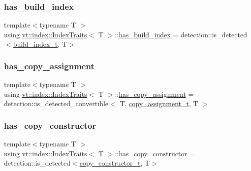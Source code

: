\subsubsection{\texorpdfstring{has\+\_\+build\+\_\+index}{has\_build\_index}}
{\footnotesize\ttfamily template$<$typename T $>$ \\
using \hyperlink{structvt_1_1index_1_1_index_traits}{vt\+::index\+::\+Index\+Traits}$<$ T $>$\+::\hyperlink{structvt_1_1index_1_1_index_traits_a9507b2186fbda410df0f7c685504e314}{has\+\_\+build\+\_\+index} =  detection\+::is\+\_\+detected$<$\hyperlink{structvt_1_1index_1_1_index_traits_a8a367bc83d2a3bd52bd5007efd6ff110}{build\+\_\+index\+\_\+t}, T$>$}

\mbox{\label{structvt_1_1index_1_1_index_traits_a2ff2ef964f69ad35d99697ad657da0c3}} 
\subsubsection{\texorpdfstring{has\+\_\+copy\+\_\+assignment}{has\_copy\_assignment}}
{\footnotesize\ttfamily template$<$typename T $>$ \\
using \hyperlink{structvt_1_1index_1_1_index_traits}{vt\+::index\+::\+Index\+Traits}$<$ T $>$\+::\hyperlink{structvt_1_1index_1_1_index_traits_a2ff2ef964f69ad35d99697ad657da0c3}{has\+\_\+copy\+\_\+assignment} =  detection\+::is\+\_\+detected\+\_\+convertible$<$ T, \hyperlink{structvt_1_1index_1_1_index_traits_ad8fed19c85f6bf6fb280a492c4bf04c5}{copy\+\_\+assignment\+\_\+t}, T $>$}

\mbox{\label{structvt_1_1index_1_1_index_traits_a7440b1a34592c08fcd93fd9a39ffbfa7}} 
\subsubsection{\texorpdfstring{has\+\_\+copy\+\_\+constructor}{has\_copy\_constructor}}
{\footnotesize\ttfamily template$<$typename T $>$ \\
using \hyperlink{structvt_1_1index_1_1_index_traits}{vt\+::index\+::\+Index\+Traits}$<$ T $>$\+::\hyperlink{structvt_1_1index_1_1_index_traits_a7440b1a34592c08fcd93fd9a39ffbfa7}{has\+\_\+copy\+\_\+constructor} =  detection\+::is\+\_\+detected$<$\hyperlink{structvt_1_1index_1_1_index_traits_ad99299628a662db3cfa5021b810e8846}{copy\+\_\+constructor\+\_\+t}, T$>$}

